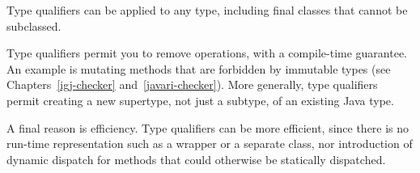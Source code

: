 Type qualifiers can be applied to any type, including final classes that
cannot be subclassed.

Type qualifiers permit you to remove operations, with a compile-time
guarantee.  An example is mutating methods that are forbidden by immutable
types (see Chapters~\ref{igj-checker} and~\ref{javari-checker}).  More
generally, type qualifiers permit creating a new supertype, not just a
subtype, of an existing Java type.

A final reason is efficiency.  Type qualifiers can be more
efficient, since there is no run-time representation such as a wrapper
or a separate class, nor introduction of dynamic dispatch for methods that
could otherwise be statically dispatched.



